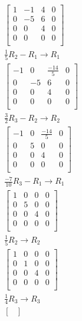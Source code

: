 \documentclass[12pt letter]{report}
\begin{document}
{\begin{align*}
\begin{bmatrix}
      1 & -1 & 4 & 0 \\
      0 & -5 & 6 & 0 \\
      0 & 0  & 4 & 0 \\
      0 & 0  & 0 & 0 \\
    \end{bmatrix}
    \\
    \frac{1}{5}R_2 - R_1  \rightarrow R_1   \\
    \begin{bmatrix}
      -1 & 0  & \frac{-14}{5} & 0 \\
      0  & -5 & 6             & 0 \\
      0  & 0  & 4             & 0 \\
      0  & 0  & 0             & 0 \\
    \end{bmatrix}
    \\
    \frac{3}{2}R_3 - R_2  \rightarrow R_2   \\
    \begin{bmatrix}
      -1 & 0 & \frac{-14}{5} & 0 \\
      0  & 5 & 0             & 0 \\
      0  & 0 & 4             & 0 \\
      0  & 0 & 0             & 0 \\
    \end{bmatrix}
    \\
    \frac{-7}{10}R_3 - R_1  \rightarrow R_1 \\
    \begin{bmatrix}
      1 & 0 & 0 & 0 \\
      0 & 5 & 0 & 0 \\
      0 & 0 & 4 & 0 \\
      0 & 0 & 0 & 0 \\
    \end{bmatrix}
    \\
    \frac{1}{5}R_2 \to R_2                  \\
    \begin{bmatrix}
      1 & 0 & 0 & 0 \\
      0 & 1 & 0 & 0 \\
      0 & 0 & 4 & 0 \\
      0 & 0 & 0 & 0 \\
    \end{bmatrix}
    \\
    \frac{1}{4}R_3 \to R_3                  \\
    \begin{bmatrix}

\end{bmatrix}
\end{align*}}
\end{document}
